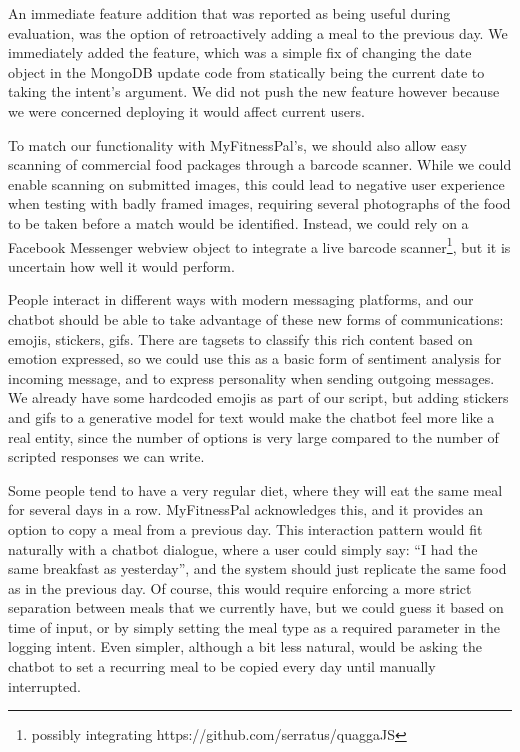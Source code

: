 An immediate feature addition that was reported as being useful during evaluation, was the option of retroactively adding a meal to the previous day. We immediately added the feature, which was a simple fix of changing the date object in the MongoDB update code from statically being the current date to taking the intent's argument. We did not push the new feature however because we were concerned deploying it would affect current users. 

To match our functionality with MyFitnessPal's, we should also allow easy scanning of commercial food packages through a barcode scanner. While we could enable scanning on submitted images, this could lead to negative user experience when testing with badly framed images, requiring several photographs of the food to be taken before a match would be identified. Instead, we could rely on a Facebook Messenger webview object to integrate a live barcode scanner\footnote{possibly integrating https://github.com/serratus/quaggaJS}, but it is uncertain how well it would perform. 

People interact in different ways with modern messaging platforms, and our chatbot should be able to take advantage of these new forms of communications: emojis, stickers, gifs. There are tagsets to classify this rich content based on emotion expressed, so we could use this as a basic form of sentiment analysis for incoming message, and to express personality when sending outgoing messages. We already have some hardcoded emojis as part of our script, but adding stickers and gifs to a generative model for text would make the chatbot feel more like a real entity, since the number of options is very large compared to the number of scripted responses we can write. 

Some people tend to have a very regular diet, where they will eat the same meal for several days in a row. MyFitnessPal acknowledges this, and it provides an option to copy a meal from a previous day. This interaction pattern would fit naturally with a chatbot dialogue, where a user could simply say: ``I had the same breakfast as yesterday'', and the system should just replicate the same food as in the previous day. Of course, this would require enforcing a more strict separation between meals that we currently have, but we could guess it based on time of input, or by simply setting the meal type as a required parameter in the logging intent. Even simpler, although a bit less natural, would be asking the chatbot to set a recurring meal to be copied every day until manually interrupted. 

